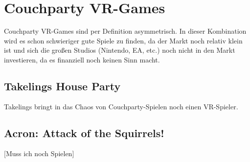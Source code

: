 \section{Couchparty VR-Games}

Couchparty VR-Games sind per Definition asymmetrisch. In dieser Kombination wird es schon schwieriger gute Spiele zu finden, da der Markt noch relativ klein ist und sich die großen Studios (Nintendo, EA, etc.) noch nicht in den Markt investieren, da es finanziell noch keinen Sinn macht.

\subsection{Takelings House Party}

Takelings bringt in das Chaos von Couchparty-Spielen noch einen VR-Spieler.

\subsection{Acron: Attack of the Squirrels!}
[Muss ich noch Spielen]